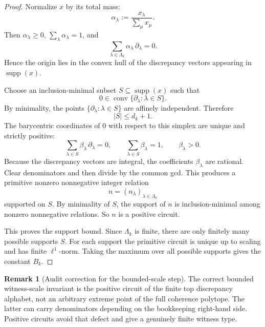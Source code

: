 \documentclass[11pt]{article}
\theoremstyle{definition}
\newtheorem{remark}[theorem]{Remark}
\newcommand{\supp}{\operatorname{supp}}
\newcommand{\1}{\mathbf{1}}
\begin{document}
\begin{proof}
Normalize $x$ by its total mass:
\[
\alpha_\lambda:=\frac{x_\lambda}{\sum_\mu x_\mu}.
\]
Then $\alpha_\lambda\ge 0$, $\sum_\lambda \alpha_\lambda=1$, and
\[
\sum_{\lambda\in \Lambda_k}\alpha_\lambda\,\partial_\lambda=0.
\]
Hence the origin lies in the convex hull of the discrepancy vectors appearing in $\supp(x)$.

Choose an inclusion-minimal subset $S\subseteq \supp(x)$ such that
\[
0\in \operatorname{conv}\{\partial_\lambda:\lambda\in S\}.
\]
By minimality, the points $\{\partial_\lambda:\lambda\in S\}$ are affinely independent.
Therefore
\[
|S|\le d_k+1.
\]
The barycentric coordinates of $0$ with respect to this simplex are unique and strictly positive:
\[
\sum_{\lambda\in S} \beta_\lambda\,\partial_\lambda=0,
\qquad
\sum_{\lambda\in S}\beta_\lambda=1,
\qquad
\beta_\lambda>0.
\]
Because the discrepancy vectors are integral, the coefficients $\beta_\lambda$ are rational.
Clear denominators and then divide by the common gcd.
This produces a primitive nonzero nonnegative integer relation
\[
n=(n_\lambda)_{\lambda\in \Lambda_k}
\]
supported on $S$.
By minimality of $S$, the support of $n$ is inclusion-minimal among nonzero nonnegative relations.
So $n$ is a positive circuit.

This proves the support bound.
Since $\Lambda_k$ is finite, there are only finitely many possible supports $S$.
For each support the primitive circuit is unique up to scaling and has finite $\ell^1$-norm.
Taking the maximum over all possible supports gives the constant $B_k$.
\end{proof}

\begin{remark}[Audit correction for the bounded-scale step]\label{rem:positive-circuit-audit}
The correct bounded witness-scale invariant is the positive circuit of the finite top discrepancy alphabet, not an arbitrary extreme point of the full coherence polytope.
The latter can carry denominators depending on the bookkeeping right-hand side.
Positive circuits avoid that defect and give a genuinely finite witness type.
\end{remark}
\end{document}
